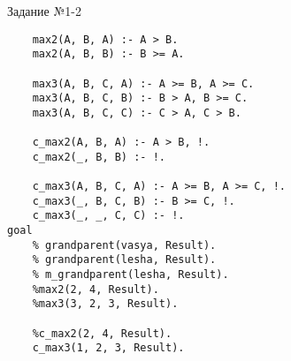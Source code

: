 \newpage

\begin{code}
\caption{Задание №1-2}
\label{code:bf3}
\begin{verbatim}
	max2(A, B, A) :- A > B.
	max2(A, B, B) :- B >= A.
	
	max3(A, B, C, A) :- A >= B, A >= C.
	max3(A, B, C, B) :- B > A, B >= C.
	max3(A, B, C, C) :- C > A, C > B.
	
	c_max2(A, B, A) :- A > B, !.
	c_max2(_, B, B) :- !.

	c_max3(A, B, C, A) :- A >= B, A >= C, !.
	c_max3(_, B, C, B) :- B >= C, !.
	c_max3(_, _, C, C) :- !.
goal
	% grandparent(vasya, Result).
	% grandparent(lesha, Result).
	% m_grandparent(lesha, Result).				  
	%max2(2, 4, Result).
	%max3(3, 2, 3, Result).
	
	%c_max2(2, 4, Result).
	c_max3(1, 2, 3, Result).
\end{verbatim}
\end{code}

